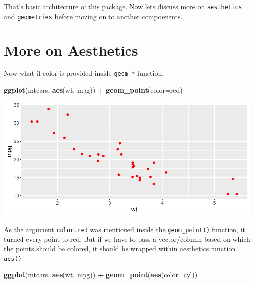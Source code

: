 \documentclass[
]{book}
\newenvironment{Shaded}{\begin{snugshade}}{\end{snugshade}}
\newcommand{\AttributeTok}[1]{\textcolor[rgb]{0.13,0.29,0.53}{#1}}
\newcommand{\FunctionTok}[1]{\textcolor[rgb]{0.13,0.29,0.53}{\textbf{#1}}}
\newcommand{\NormalTok}[1]{#1}
\newcommand{\SpecialCharTok}[1]{\textcolor[rgb]{0.81,0.36,0.00}{\textbf{#1}}}
\newcommand{\StringTok}[1]{\textcolor[rgb]{0.31,0.60,0.02}{#1}}
\begin{document}
That's basic architecture of this package. Now lets discuss more on \texttt{aesthetics} and \texttt{geometries} before moving on to another compoenents.

\hypertarget{more-on-aesthetics}{%
\section{More on Aesthetics}\label{more-on-aesthetics}}

Now what if color is provided inside \texttt{geom\_*} function.

\begin{Shaded}
\begin{Highlighting}[]
\FunctionTok{ggplot}\NormalTok{(mtcars, }\FunctionTok{aes}\NormalTok{(wt, mpg)) }\SpecialCharTok{+}
  \FunctionTok{geom\_point}\NormalTok{(}\AttributeTok{color=}\StringTok{\textquotesingle{}red\textquotesingle{}}\NormalTok{)}
\end{Highlighting}
\end{Shaded}

\begin{center}\includegraphics{DauR_files/figure-latex/fig_5-1} \end{center}

As the argument \texttt{color=\textquotesingle{}red\textquotesingle{}} was mentioned inside the \texttt{geom\_point()} function, it turned every point to red. But if we have to pass a vector/column based on which the points should be colored, it should be wrapped within aesthetics function \texttt{aes()} -

\begin{Shaded}
\begin{Highlighting}[]
\FunctionTok{ggplot}\NormalTok{(mtcars, }\FunctionTok{aes}\NormalTok{(wt, mpg)) }\SpecialCharTok{+}
  \FunctionTok{geom\_point}\NormalTok{(}\FunctionTok{aes}\NormalTok{(}\AttributeTok{color=}\NormalTok{cyl))}
\end{Highlighting}
\end{Shaded}
\end{document}
